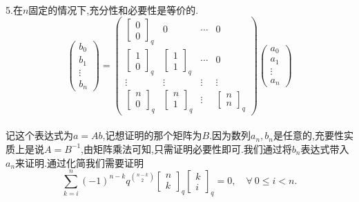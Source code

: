 \documentclass[b5paper]{ctexart}
\begin{document}
\\
5.在$n$固定的情况下,充分性和必要性是等价的.
\[
\left( \begin{array}{c}
b_0\\
b_1\\
\vdots\\
b_n
\end{array}\right)=\left( \begin{array}{cccc}
\left[ \begin{array}{c}
0\\
0
\end{array}\right]_q & 0 & \cdots & 0\\ 
\left[ \begin{array}{c}
1\\
0
\end{array}\right]_q &\left[ \begin{array}{c}
1\\
1
\end{array}\right]_q &\cdots & 0\\
\vdots &\vdots &\vdots &\vdots \\
\left[ \begin{array}{c}
n\\
0
\end{array}\right]_q&\left[ \begin{array}{c}
n\\
1
\end{array}\right]_q&\vdots &\left[ \begin{array}{c}
n\\
n
\end{array}\right]_q
\end{array}\right) 
\left( \begin{array}{c}
a_0\\
a_1\\
\vdots\\
a_n
\end{array}\right) \]
\\
记这个表达式为$a=Ab$,记想证明的那个矩阵为$B$.因为数列${a_n},{b_n}$是任意的,充要性实质上是说$A=B^{-1}$,由矩阵乘法可知,只需证明必要性即可.我们通过将$b_n$表达式带入$a_n$来证明.通过化简我们需要证明
\[\sum_{k=i}^n(-1)^{n-k}q^{\binom{n-k}{2}}\left[ \begin{array}{c}
n\\
k
\end{array}\right]_q\left[ \begin{array}{c}
k\\
i
\end{array}\right]_q=0,\quad \forall~ 0\leq i<n.\]
\end{document}
